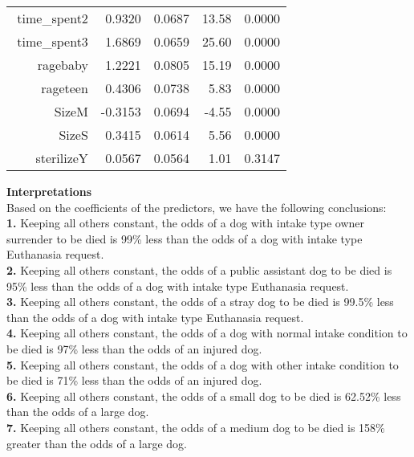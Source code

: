 \documentclass[12pt]{article}
\begin{document}
\begin{flushleft}
\begin{center}
\begin{table}[H]
\begin{tabular}{rrrrr}
$$  time\_spent2 & 0.9320 & 0.0687 & 13.58 & 0.0000 \\ 
  time\_spent3 & 1.6869 & 0.0659 & 25.60 & 0.0000 \\ 
  ragebaby & 1.2221 & 0.0805 & 15.19 & 0.0000 \\ 
  rageteen & 0.4306 & 0.0738 & 5.83 & 0.0000 \\ 
  SizeM & -0.3153 & 0.0694 & -4.55 & 0.0000 \\ 
  SizeS & 0.3415 & 0.0614 & 5.56 & 0.0000 \\ 
  sterilizeY & 0.0567 & 0.0564 & 1.01 & 0.3147 \\ 
   \hline
\end{tabular}
\end{table}
\end{center}
\textbf{Interpretations}\\
Based on the coefficients of the predictors, we have the following conclusions:\\
 
\textbf{1.} Keeping all others constant, the odds of a dog with intake type owner surrender to be died is 99\% less than the odds of a dog with intake type Euthanasia request.\\
 
\textbf{2.} Keeping all others constant, the odds of a public assistant dog to be died is 95\% less than the odds of a dog with intake type Euthanasia request.\\
 
\textbf{3.} Keeping all others constant, the odds of a stray dog to be died is 99.5\% less than the odds of a dog with intake type Euthanasia request.\\
 
\textbf{4.} Keeping all others constant, the odds of a dog with normal intake condition to be died is 97\% less than the odds of an injured dog.\\
 
\textbf{5.} Keeping all others constant, the odds of a dog with other intake condition to be died is 71\% less than the odds of an injured dog.\\
 
\textbf{6.} Keeping all others constant, the odds of a small dog to be died is 62.52\% less than the odds of a large dog.\\
 
\textbf{7.} Keeping all others constant, the odds of a medium dog to be died is 158\% greater than the odds of a large dog.\\
 

\end{flushleft}
\end{document}
